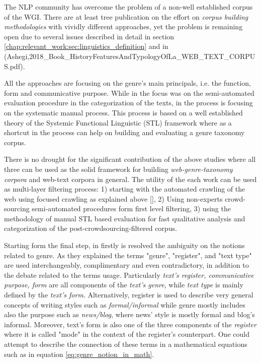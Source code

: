 The NLP community has overcome the problem of a non-well established corpus of the WGI. There are at least tree publication on the effort on \textit{corpus building methodologies} with vividly different approaches, yet the problem is remaining open due to several issues described in detail in section \ref{chap:relevant_work:sec:linguistics_definition} and in \parencite{melissourgou2017genre,asheghi2014semi} (Ashegi,2018_Book_HistoryFeaturesAndTypologyOfLa_WEB_TEXT_CORPUS.pdf). 

All the approaches are focusing on the genre's main principals, i.e. the function, form and communicative purpose. While in \parencite{asheghi2014semi} the focus was on the semi-automated evaluation procedure in the categorization of the texts, in \parencite{melissourgou2017genre} the process is focusing on the systematic manual process. This process is based on a well established theory of  the Systemic Functional Linguistic (STL) framework where as a shortcut in the process can help on building and evaluating a genre taxonomy corpus. 

There is no drought for the significant contribution of the above studies where all three can be used as the solid framework for building \textit{web-genre-taxonomy corpora} and web-text corpora in general. The utility of the each work can be used as multi-layer filtering process:  1) starting with the automated crawling of the web using focused crawling as explained above \ref{}, 2) Using non-experts crowd-sourcing semi-automated procedures form first level filtering, 3) using the methodology of manual STL based evaluation for fast qualitative analysis and categorization of the post-crowdsourcing-filtered corpus. 

Starting form the final step, in \parencite{melissourgou2017genre} firstly is resolved the ambiguity on the notions related to genre. As they explained the terms "genre", "register", and "text type" are used interchangeably, complimentary and even contradictory, in addition to the debate related to the terms usage. Particularly \textit{text's register, communicative purpose, form} are all components of the \textit{text's genre}, while \textit{text type} is mainly defined by the \textit{text's form}. Alternatively, register is used to describe very general concepts of writing styles such as \textit{formal/informal} while genre mostly includes also the purpose such as \textit{news/blog}, where news' style is mostly formal and blog's informal. Moreover, text's form is also one of the three components of the \textit{register} where it is called "mode" in the context of the register's counterpart. One could attempt to describe the connection of these terms in a mathematical equations such as in equation \ref{eq:genre_notion_in_math}.  

